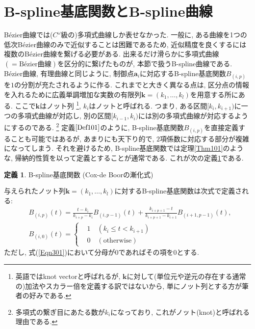 \documentclass{jsarticle}
\theoremstyle{definition}%
\newtheorem{defn}[thm]{定義}
\begin{document}
\section{B-spline基底関数とB-spline曲線}
B\'ezier曲線では($C^\omega$級\footnotemark の)多項式曲線しか表せなかった.
一般に, ある曲線を1つの低次B\'ezier曲線のみで近似することは困難であるため, 近似精度を良くするには複数のB\'ezier曲線を繋げる必要がある.
出来るだけ滑らかに多項式曲線$(=\text{B\'ezier曲線})$を区分的に繋げたものが, 本節で扱うB-spline曲線である.
B\'ezier曲線, 有理曲線と同じように, 制御点$\bm{a}_i$に対応するB-spline基底関数$B_{(i,p)}$を$1$の分割が充たされるように作る.
これまでと大きく異なる点は, 区分点の情報を入れるために広義単調増加な実数の有限列$\bm{k}=(k_1, \dots , k_l)$を用意する所にある.
ここで$\bm{k}$はノット列%
\footnote{英語ではknot vectorと呼ばれるが, $\bm{k}$に対して(単位元や逆元の存在する通常の)加法やスカラー倍を定義する訳ではないから, 単にノット列とする方が筆者の好みである.
}, $k_{i}$はノットと呼ばれる.
つまり, ある区間$[k_{i}, k_{i+1})$に一つの多項式曲線が対応し, 別の区間$[k_{i-1}, k_{i})$には別の多項式曲線が対応するようにするのである.%
\footnote{多項式の繋ぎ目にあたる数が$k_{i}$になっており, これがノット(knot)と呼ばれる理由である.}
定義$\ref{Def101}$のように, B-spline基底関数$B_{(i,p)}$を直接定義することも可能ではあるが, あまりにも天下り的で, $2$項係数に対応する部分が複雑になってしまう.
それを避けるため, B-spline基底関数では定理\ref{Thm101}のような, 帰納的性質を以って定義とすることが通常である.
これが次の定義\ref{Def301}である.
\begin{screen}
	\begin{defn}
        \label{Def301}
		B-spline基底関数 (Cox-de Boorの漸化式)

		与えられたノット列$\bm{k}=(k_1, \dots , k_l)$に対するB-spline基底関数は次式で定義される:
		\begin{align}
			\label{Eqn301}
			&{B}_{(i,p)}(t)
			=
			\frac{t-k_{i}}{k_{i+p}-k_{i}}{B}_{(i,p-1)}(t)
			+\frac{k_{i+p+1}-t}{k_{i+p+1}-k_{i+1}}{B}_{(i+1,p-1)}(t), \\
			\label{Eqn302}
			&{B}_{(i,0)} (t)
			=
			\begin{cases}
				&1\quad (k_{i}\le t< k_{i+1})\\
				&0\quad (\text{otherwise})
			\end{cases}
		\end{align}
		ただし, 式(\ref{Eqn301})において分母が$0$であればその項を$0$とする.
	\end{defn}
\end{screen}
\end{document}
